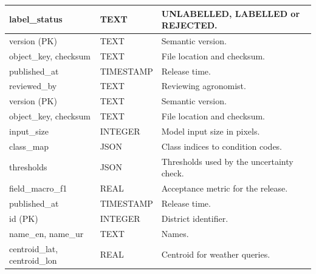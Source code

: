 {\begin{longtable}{|L{4.0cm}|L{2.6cm}|L{8.0cm}|}
label\_status & TEXT & UNLABELLED, LABELLED or REJECTED. \\ \hline
{}
version (PK) & TEXT & Semantic version. \\ \hline
object\_key, checksum & TEXT & File location and checksum. \\ \hline
published\_at & TIMESTAMP & Release time. \\ \hline
reviewed\_by & TEXT & Reviewing agronomist. \\ \hline
{}
version (PK) & TEXT & Semantic version. \\ \hline
object\_key, checksum & TEXT & File location and checksum. \\ \hline
input\_size & INTEGER & Model input size in pixels. \\ \hline
class\_map & JSON & Class indices to condition codes. \\ \hline
thresholds & JSON & Thresholds used by the uncertainty check. \\ \hline
field\_macro\_f1 & REAL & Acceptance metric for the release. \\ \hline
published\_at & TIMESTAMP & Release time. \\ \hline
{}
id (PK) & INTEGER & District identifier. \\ \hline
name\_en, name\_ur & TEXT & Names. \\ \hline
centroid\_lat, centroid\_lon & REAL & Centroid for weather queries. \\ \hline
\end{longtable}
}

